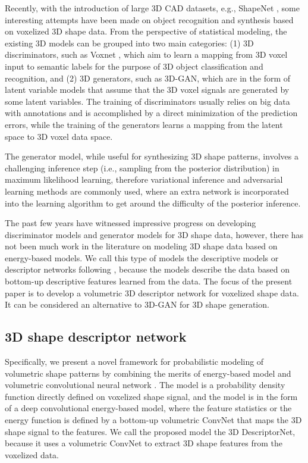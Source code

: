 \documentclass[10pt,twocolumn,letterpaper]{article}
\begin{document}
Recently, with the introduction of large 3D CAD datasets, e.g., ShapeNet \cite{wu20153d, chang2015shapenet}, some interesting attempts \cite{girdhar2016learning, su2015multi,qi2016volumetric} have been made on object recognition and synthesis based on voxelized 3D shape data. From the perspective of statistical modeling, the existing 3D models can be grouped into two main categories: (1) 3D discriminators, such as Voxnet \cite{maturana2015voxnet}, which aim to learn a mapping from 3D voxel input to semantic labels for the purpose of 3D object classification and recognition, and (2) 3D generators, such as 3D-GAN\cite{3dgan}, which are in the form of latent variable models that assume that the 3D voxel signals are generated by some latent variables. The training of discriminators usually relies on big data with annotations and is accomplished by a direct minimization of the prediction errors, while the training of the generators  learns a mapping from the latent space to 3D voxel data space. 

The generator model, while useful for synthesizing 3D shape patterns, involves a challenging inference step (i.e., sampling from the posterior distribution) in maximum likelihood learning, therefore variational inference \cite{kingma2013auto} and adversarial learning \cite{goodfellow2014generative, radford2015unsupervised, 3dgan} methods are commonly used, where an extra network is incorporated into the learning algorithm to get around the difficulty of the posterior inference. 

The past few years have witnessed impressive progress on developing  discriminator models and generator models for 3D shape data, however, there has not been much work in the literature on modeling 3D shape data based on energy-based models. We call this type of models the descriptive models or descriptor networks following \cite{zhu2003statistical}, because the models describe the data based on bottom-up descriptive features learned from the data. The focus of the present paper is to develop a volumetric 3D descriptor network for voxelized shape data. It can be considered an alternative to 3D-GAN \cite{3dgan} for 3D shape generation. 

\subsection{3D shape descriptor network}
Specifically, we present a novel framework for probabilistic modeling of volumetric shape patterns  by combining the merits of energy-based model \cite{Lecun2006} and volumetric convolutional neural network \cite{maturana2015voxnet}. The model is a probability density function directly defined on voxelized shape signal, and the model is in the form of a deep convolutional energy-based model, where the feature statistics or the energy function is defined by a bottom-up volumetric ConvNet that maps the 3D shape signal to the features. 
We call the proposed model the 3D DescriptorNet, because it uses a volumetric ConvNet to extract 3D shape features from the voxelized data.  
\end{document}
